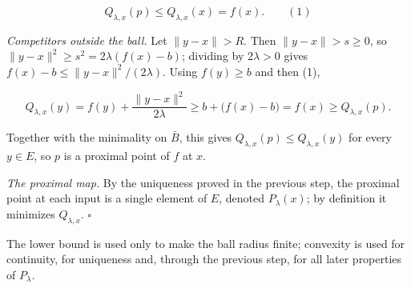 \documentclass[11pt,a4paper]{report}
\begin{document}
\[Q_{\lambda,x}(p)\le Q_{\lambda,x}(x)=f(x).\qquad(1)\]


\emph{Competitors outside the ball.} Let \(\|y-x\|>R\). Then \(\|y-x\|>s\ge0\), so \(\|y-x\|^2\ge s^2=2\lambda(f(x)-b)\); dividing by \(2\lambda>0\) gives \(f(x)-b\le\|y-x\|^2/(2\lambda)\). Using \(f(y)\ge b\) and then (1),


\[Q_{\lambda,x}(y)=f(y)+\frac{\|y-x\|^2}{2\lambda}\ge b+\bigl(f(x)-b\bigr)=f(x)\ge Q_{\lambda,x}(p).\]


Together with the minimality on \(\bar B\), this gives \(Q_{\lambda,x}(p)\le Q_{\lambda,x}(y)\) for every \(y\in E\), so \(p\) is a proximal point of \(f\) at \(x\).




\emph{The proximal map.} By the uniqueness proved in the previous step, the proximal point at each input is a single element of \(E\), denoted \(P_\lambda(x)\); by definition it minimizes \(Q_{\lambda,x}\). \(\square\)




The lower bound is used only to make the ball radius finite; convexity is used for continuity, for uniqueness and, through the previous step, for all later properties of \(P_\lambda\).
\end{document}
